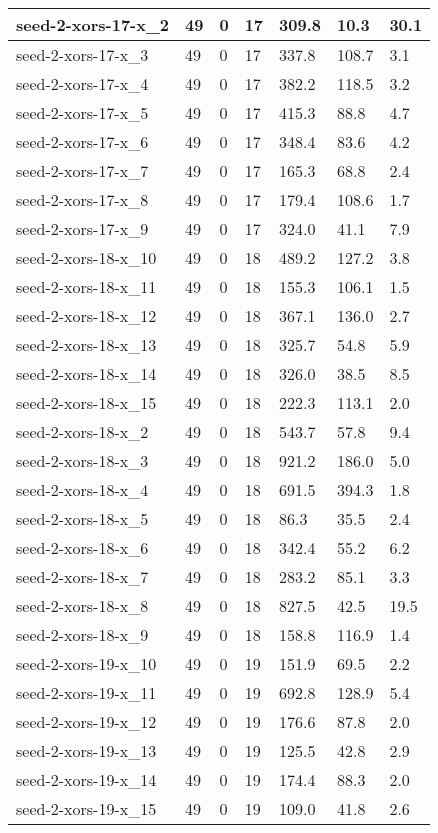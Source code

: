 \begin{scriptsize}
\begin{longtable}{|p{5cm}|l|l|l|l|l|l|}
seed-2-xors-17-x\_2&49&0&17&309.8&10.3&30.1 \\ \hline 
seed-2-xors-17-x\_3&49&0&17&337.8&108.7&3.1 \\ \hline 
seed-2-xors-17-x\_4&49&0&17&382.2&118.5&3.2 \\ \hline 
seed-2-xors-17-x\_5&49&0&17&415.3&88.8&4.7 \\ \hline 
seed-2-xors-17-x\_6&49&0&17&348.4&83.6&4.2 \\ \hline 
seed-2-xors-17-x\_7&49&0&17&165.3&68.8&2.4 \\ \hline 
seed-2-xors-17-x\_8&49&0&17&179.4&108.6&1.7 \\ \hline 
seed-2-xors-17-x\_9&49&0&17&324.0&41.1&7.9 \\ \hline 
seed-2-xors-18-x\_10&49&0&18&489.2&127.2&3.8 \\ \hline 
seed-2-xors-18-x\_11&49&0&18&155.3&106.1&1.5 \\ \hline 
seed-2-xors-18-x\_12&49&0&18&367.1&136.0&2.7 \\ \hline 
seed-2-xors-18-x\_13&49&0&18&325.7&54.8&5.9 \\ \hline 
seed-2-xors-18-x\_14&49&0&18&326.0&38.5&8.5 \\ \hline 
seed-2-xors-18-x\_15&49&0&18&222.3&113.1&2.0 \\ \hline 
seed-2-xors-18-x\_2&49&0&18&543.7&57.8&9.4 \\ \hline 
seed-2-xors-18-x\_3&49&0&18&921.2&186.0&5.0 \\ \hline 
seed-2-xors-18-x\_4&49&0&18&691.5&394.3&1.8 \\ \hline 
seed-2-xors-18-x\_5&49&0&18&86.3&35.5&2.4 \\ \hline 
seed-2-xors-18-x\_6&49&0&18&342.4&55.2&6.2 \\ \hline 
seed-2-xors-18-x\_7&49&0&18&283.2&85.1&3.3 \\ \hline 
seed-2-xors-18-x\_8&49&0&18&827.5&42.5&19.5 \\ \hline 
seed-2-xors-18-x\_9&49&0&18&158.8&116.9&1.4 \\ \hline 
seed-2-xors-19-x\_10&49&0&19&151.9&69.5&2.2 \\ \hline 
seed-2-xors-19-x\_11&49&0&19&692.8&128.9&5.4 \\ \hline 
seed-2-xors-19-x\_12&49&0&19&176.6&87.8&2.0 \\ \hline 
seed-2-xors-19-x\_13&49&0&19&125.5&42.8&2.9 \\ \hline 
seed-2-xors-19-x\_14&49&0&19&174.4&88.3&2.0 \\ \hline 
seed-2-xors-19-x\_15&49&0&19&109.0&41.8&2.6 \\ \hline 

\end{longtable}
\end{scriptsize}
